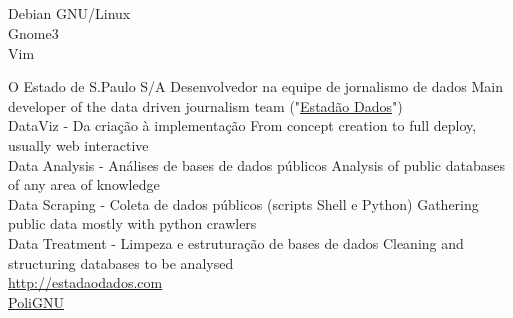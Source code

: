 \documentclass[]{friggeri-cv}
\begin{document}
\begin{aside}
  \section{}
    Debian GNU/Linux \\%
    Gnome3 \\%
    Vim
\end{aside}

\begin{entrylist}
  \entry
    {}
    {}
    {O Estado de S.Paulo S/A}
    {%
        {Desenvolvedor na equipe de jornalismo de dados}%
        {Main developer of the data driven journalism team}
        ("\href{http://estadaodados.com}{Estadão Dados}")\\
     DataViz - %
         {Da criação à implementação}%
         {From concept creation to full deploy, usually web interactive}\\
     Data Analysis - %
         {Análises de bases de dados públicos}%
         {Analysis of public databases of any area of knowledge}\\
     Data Scraping - %
         {Coleta de dados públicos (scripts Shell e Python)}%
         {Gathering public data mostly with python crawlers}\\
     Data Treatment - %
         {Limpeza e estruturação de bases de dados}%
         {Cleaning and structuring databases to be analysed}\\
     \href{http://estadaodados.com}{http://estadaodados.com}\\}
  \entry
    {}
    {}
    {\href{http://polignu.org}{PoliGNU}}
    {\\
    \\
}
\end{entrylist}
\end{document}
